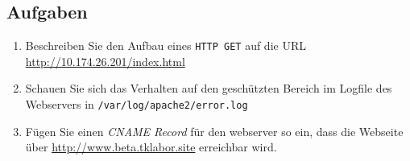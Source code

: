 \subsection{Aufgaben}
\begin{enumerate}
  \item Beschreiben Sie den Aufbau eines \texttt{HTTP GET} auf die URL
  \url{http://10.174.26.201/index.html}
  \item Schauen Sie sich das Verhalten auf den geschützten Bereich im Logfile
  des Webservers in \texttt{/var/log/apache2/error.log}
  \item Fügen Sie einen \textit{CNAME Record} für den webserver so ein, dass die
  Webseite über \url{http://www.beta.tklabor.site} erreichbar wird.
\end{enumerate}